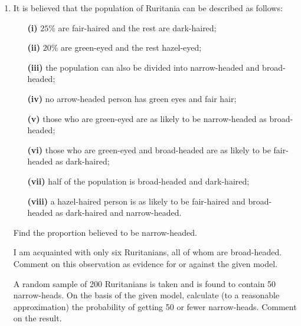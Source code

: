 \documentclass[a4, 11pt]{report}
\newlength{\qspace}
\newcounter{qnumber}
\newenvironment{question}%
 {\vspace{\qspace}
  \begin{enumerate}[\bfseries 1\quad][10]%
    \setcounter{enumi}{\value{qnumber}}%
    \item%
 }
{
  \end{enumerate}
  \filbreak
  \stepcounter{qnumber}
 }
\begin{document}
\begin{question}
It is believed that the population of Ruritania can be described as
follows: 

\begin{itemize}[indent]
\setlength{\itemsep}{3mm}

\item[\bf (i)] $25\%$ are fair-haired and the rest are dark-haired; 
\item[\bf (ii)] $20\%$ are green-eyed and the rest hazel-eyed; 
\item[\bf (iii)] the population can also be divided into narrow-headed and broad-headed; 
\item[\bf (iv)] no arrow-headed person has green eyes and fair hair; 
\item[\bf (v)] those who are green-eyed are as likely to be narrow-headed as broad-headed; 
\item[\bf (vi)] those who are green-eyed and broad-headed are as likely to be fair-headed
as dark-haired; 
\item[\bf (vii)] half of the population is broad-headed and dark-haired; 
\item[\bf (viii)] a hazel-haired person is as likely to be fair-haired and broad-headed
as dark-haired and narrow-headed. 
\end{itemize}

Find the proportion believed to be narrow-headed. 


I am acquainted with only six Ruritanians, all of whom are broad-headed.
Comment on this observation as evidence for or against the given model. 


A random sample of 200 Ruritanians is taken and is found to contain
50 narrow-heads. On the basis of the given model, calculate (to a
reasonable approximation) the probability of getting 50 or fewer narrow-heads.
Comment on the result. 
\end{question}
\end{document}
